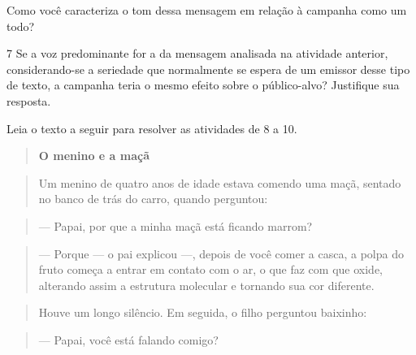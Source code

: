 Como você caracteriza o tom dessa mensagem em relação à campanha como um
todo?


\num{7} Se a voz predominante for a da mensagem analisada na atividade
anterior, considerando-se a seriedade que normalmente se espera de um emissor desse tipo de texto, a campanha teria o mesmo efeito sobre o público-alvo?
Justifique sua resposta.


Leia o texto a seguir para resolver as atividades de 8 a 10.

\begin{quote}
\centering\textbf{O menino e a maçã}
\end{quote}


\begin{quote}
Um menino de quatro anos de idade estava comendo uma maçã, sentado no
banco de trás do carro, quando perguntou:
\end{quote}

\begin{quote}
--- Papai, por que a minha maçã está ficando marrom?
\end{quote}

\begin{quote}
--- Porque --- o pai explicou ---, depois de você comer a casca, a polpa
do fruto começa a entrar em contato com o ar, o que faz com que oxide,
alterando assim a estrutura molecular e tornando sua cor diferente.
\end{quote}

\begin{quote}
Houve um longo silêncio. Em seguida, o filho perguntou baixinho:
\end{quote}

\begin{quote}
--- Papai, você está falando comigo?
\end{quote}

